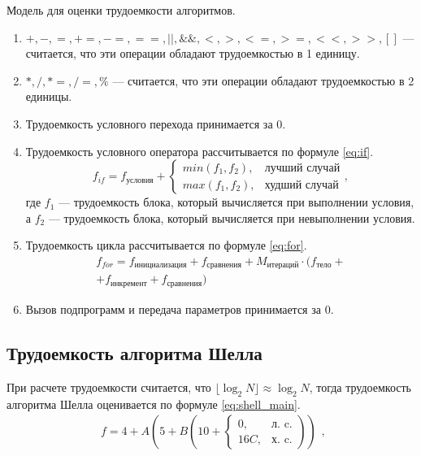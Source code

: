 Модель для оценки трудоемкости алгоритмов.
\begin{enumerate}
	\item $+, -, =, +=, -=, ==, ||, \&\&, <, >, <=, >=, <<, >>, []$ --- считается, что эти операции обладают трудоемкостью в 1 единицу.
	\item $*, /, *=, /=, \% $ --- считается, что эти операции обладают трудоемкостью в 2 единицы.
	\item Трудоемкость условного перехода принимается за $0$.
	\item Трудоемкость условного оператора рассчитывается по формуле \eqref{eq:if}. 
	\begin{equation}
		\label{eq:if}
		f_{if} = f_{\text{условия}} + 
		\begin{cases}
			min(f_1, f_2), & \text{лучший случай}\\
			max(f_1, f_2), & \text{худший случай}
		\end{cases},
	\end{equation}
	где $f_1$ --- трудоемкость блока, который вычисляется при выполнении условия, а $f_2$ --- трудоемкость блока, который вычисляется при невыполнении условия.
	\item Трудоемкость цикла рассчитывается по формуле \eqref{eq:for}.
	\begin{equation}
		\label{eq:for}
		\begin{gathered}
			f_{for} = f_{\text{инициализация}} + f_{\text{сравнения}} + M_{\text{итераций}} \cdot (f_{\text{тело}} +\\
			+ f_{\text{инкремент}} + f_{\text{сравнения}})
		\end{gathered}
	\end{equation}
	\item Вызов подпрограмм и передача параметров принимается за $0$.
\end{enumerate}

\subsection{Трудоемкость алгоритма Шелла}

При расчете трудоемкости считается, что $\lfloor \log_{2}N \rfloor \approx \log_{2}N $, тогда трудоемкость алгоритма Шелла оценивается по формуле \eqref{eq:shell_main}.
\begin{equation}
	\label{eq:shell_main}
	\begin{gathered}
		f = 4 + A (5 + B(10 + \begin{cases}
			0, & \text{л.~c.}\\
			16 C, & \text{х.~c.}
		\end{cases}))
	\end{gathered},
\end{equation}

